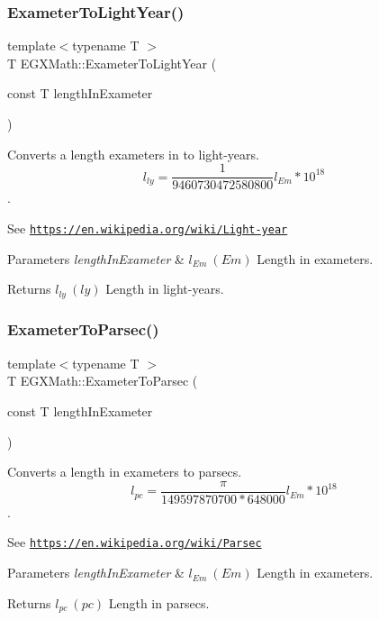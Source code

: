 \subsubsection{\texorpdfstring{Exameter\+To\+Light\+Year()}{ExameterToLightYear()}}
{\footnotesize\ttfamily template$<$typename T $>$ \\
T E\+G\+X\+Math\+::\+Exameter\+To\+Light\+Year (\begin{DoxyParamCaption}\item[{const T}]{length\+In\+Exameter }\end{DoxyParamCaption})}



Converts a length exameters in to light-\/years. \[ l_{ly}= \frac{1}{9460730472580800} l_{Em} * 10^{18} \]. 

See \href{https://en.wikipedia.org/wiki/Light-year}{\tt https\+://en.\+wikipedia.\+org/wiki/\+Light-\/year} 
\begin{DoxyParams}{Parameters}
{\em length\+In\+Exameter} & $ l_{Em}\ (Em)$ Length in exameters. \\
\hline
\end{DoxyParams}
\begin{DoxyReturn}{Returns}
$ l_{ly}\ (ly)$ Length in light-\/years. 
\end{DoxyReturn}
\mbox{\label{group___e_g_x_math-_conversions-_length_conversions-_exameter-_astronomical_ga807fef0b23d3c3c9b4a11c26bcd36b6e}} 
\subsubsection{\texorpdfstring{Exameter\+To\+Parsec()}{ExameterToParsec()}}
{\footnotesize\ttfamily template$<$typename T $>$ \\
T E\+G\+X\+Math\+::\+Exameter\+To\+Parsec (\begin{DoxyParamCaption}\item[{const T}]{length\+In\+Exameter }\end{DoxyParamCaption})}



Converts a length in exameters to parsecs. \[ l_{pc}=\frac{\pi}{149597870700 * 648000} l_{Em} * 10^{18} \]. 

See \href{https://en.wikipedia.org/wiki/Parsec}{\tt https\+://en.\+wikipedia.\+org/wiki/\+Parsec} 
\begin{DoxyParams}{Parameters}
{\em length\+In\+Exameter} & $ l_{Em}\ (Em)$ Length in exameters. \\
\hline
\end{DoxyParams}
\begin{DoxyReturn}{Returns}
$ l_{pc}\ (pc)$ Length in parsecs. 
\end{DoxyReturn}
